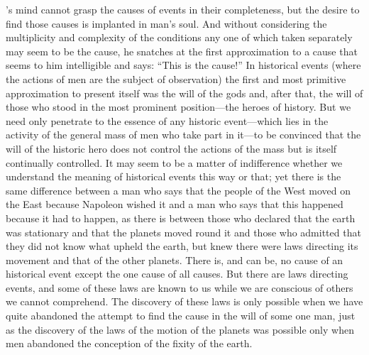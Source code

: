 's mind cannot grasp the causes of events in their
completeness, but the desire to find those causes is implanted in
man's soul. And without considering the multiplicity and
complexity of the conditions any one of which taken separately
may seem to be the cause, he snatches at the first approximation
to a cause that seems to him intelligible and says: ``This is the
cause!'' In historical events (where the actions of men are the
subject of observation) the first and most primitive
approximation to present itself was the will of the gods and,
after that, the will of those who stood in the most prominent
position---the heroes of history.  But we need only penetrate to
the essence of any historic event---which lies in the activity of
the general mass of men who take part in it---to be convinced
that the will of the historic hero does not control the actions
of the mass but is itself continually controlled. It may seem to
be a matter of indifference whether we understand the meaning of
historical events this way or that; yet there is the same
difference between a man who says that the people of the West
moved on the East because Napoleon wished it and a man who says
that this happened because it had to happen, as there is between
those who declared that the earth was stationary and that the
planets moved round it and those who admitted that they did not
know what upheld the earth, but knew there were laws directing
its movement and that of the other planets. There is, and can be,
no cause of an historical event except the one cause of all
causes. But there are laws directing events, and some of these
laws are known to us while we are conscious of others we cannot
comprehend.  The discovery of these laws is only possible when we
have quite abandoned the attempt to find the cause in the will of
some one man, just as the discovery of the laws of the motion of
the planets was possible only when men abandoned the conception
of the fixity of the earth.

